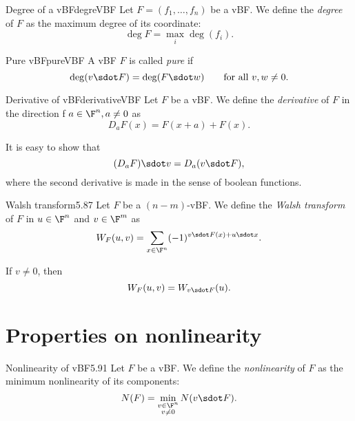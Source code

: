 \begin{defn}{Degree of a vBF}{degreVBF}
	Let \(F=(f_1,\ldots,f_n)\) be a vBF. We define the \emph{degree} of \(F\) as the maximum degree of its coordinate:
	\[
		\deg F = \max_{i} \deg(f_i).
	\]
\end{defn}

\begin{defn}{Pure vBF}{pureVBF}
	A vBF \(F\) is called \emph{pure} if
	\[
		\deg(v\sdot F) = \deg (F\sdot w) \qquad\text{for all }v,w\neq 0.
	\]
\end{defn}

\begin{defn}{Derivative of vBF}{derivativeVBF}
	Let \(F\) be a vBF. We define the \emph{derivative} of \(F\) in the direction f \(a\in \F^n, a \neq 0\) as
	\[
		D_a F(x) = F(x+a) + F(x).
	\]
\end{defn}

\begin{oss}
	It is easy to show that
	\[
		(D_a F) \sdot v = D_a(v\sdot F),
	\]
	where the second derivative is made in the sense of boolean functions.
\end{oss}

\begin{defn}{Walsh transform}{5.87}
	Let \(F\) be a \((n-m)\)-vBF. We define the \emph{Walsh transform} of \(F\) in \(u\in\F^n\) and \(v\in\F^m\) as
	\[
		W_F(u,v) = \sum_{x\in\F^n}(-1)^{v\sdot F(x)+u\sdot x}.
	\]
\end{defn}

\begin{oss}
	If \(v\neq 0\), then
	\[
		W_F(u,v) = W_{v\sdot F}(u).
	\]
\end{oss}

\section{Properties on nonlinearity}

\begin{defn}{Nonlinearity of vBF}{5.91}
	Let \(F\) be a vBF. We define the \emph{nonlinearity} of \(F\) as the minimum nonlinearity of its components:
	\[
		N(F) = \min_{\substack{v \in \F^n\\v\neq 0}}N(v\sdot F).
	\]
\end{defn}

